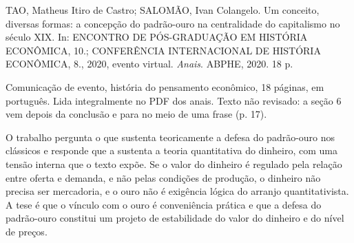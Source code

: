 
\begin{identificacao}
TAO, Matheus Itiro de Castro; SALOMÃO, Ivan Colangelo. Um conceito, diversas
formas: a concepção do padrão-ouro na centralidade do capitalismo no século
XIX. In: ENCONTRO DE PÓS-GRADUAÇÃO EM HISTÓRIA ECONÔMICA, 10.; CONFERÊNCIA
INTERNACIONAL DE HISTÓRIA ECONÔMICA, 8., 2020, evento virtual. \emph{Anais}.
ABPHE, 2020. 18 p.

Comunicação de evento, história do pensamento econômico, 18 páginas, em
português. Lida integralmente no PDF dos anais. Texto não revisado: a seção 6
vem depois da conclusão e para no meio de uma frase (p. 17).
\end{identificacao}

O trabalho pergunta o que sustenta teoricamente a defesa do padrão-ouro nos
clássicos e responde que a sustenta a teoria quantitativa do dinheiro, com uma
tensão interna que o texto expõe. Se o valor do dinheiro é regulado pela
relação entre oferta e demanda, e não pelas condições de produção, o dinheiro
não precisa ser mercadoria, e o ouro não é exigência lógica do arranjo
quantitativista. A tese é que o vínculo com o ouro é conveniência prática e que
a defesa do padrão-ouro constitui um projeto de estabilidade do valor do
dinheiro e do nível de preços.

